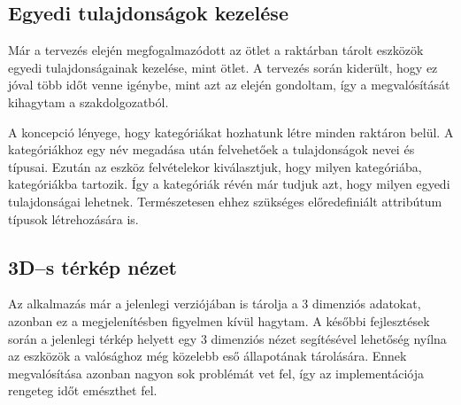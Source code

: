 \subsection{Egyedi tulajdonságok kezelése}
Már a tervezés elején megfogalmazódott az ötlet a raktárban tárolt eszközök egyedi tulajdonságainak kezelése, mint ötlet.
A tervezés során kiderült, hogy ez jóval több időt venne igénybe, mint azt az elején gondoltam, így a megvalósítását kihagytam a szakdolgozatból.

A koncepció lényege, hogy kategóriákat hozhatunk létre minden raktáron belül.
A kategóriákhoz egy név megadása után felvehetőek a tulajdonságok nevei és típusai.
Ezután az eszköz felvételekor kiválasztjuk, hogy milyen kategóriába, kategóriákba tartozik. 
Így a kategóriák révén már tudjuk azt, hogy milyen egyedi tulajdonságai lehetnek. Természetesen ehhez szükséges előredefiniált attribútum típusok létrehozására is.

\subsection{3D–s térkép nézet}
Az alkalmazás már a jelenlegi verziójában is tárolja a 3 dimenziós adatokat, azonban ez a megjelenítésben figyelmen kívül hagytam.
A későbbi fejlesztések során a jelenlegi térkép helyett egy 3 dimenziós nézet segítésével lehetőség nyílna az eszközök a valósághoz még közelebb eső állapotának tárolására. Ennek megvalósítása azonban nagyon sok problémát vet fel, így az implementációja rengeteg időt emészthet fel.

